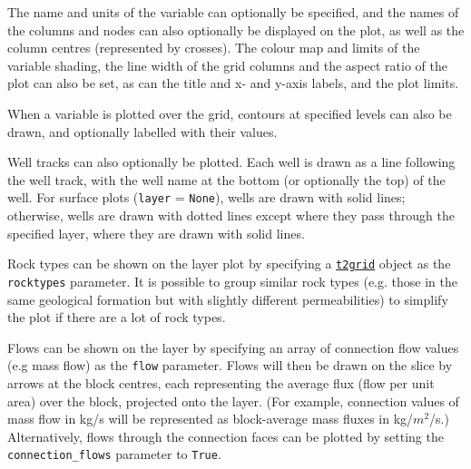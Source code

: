 The name and units of the variable can optionally be specified, and the names of the columns and nodes can also optionally be displayed on the plot, as well as the column centres (represented by crosses).  The colour map and limits of the variable shading, the line width of the grid columns and the aspect ratio of the plot can also be set, as can the title and x- and y-axis labels, and the plot limits.

When a variable is plotted over the grid, contours at specified levels can also be drawn, and optionally labelled with their values.

Well tracks can also optionally be plotted.  Each well is drawn as a line following the well track, with the well name at the bottom (or optionally the top) of the well.  For surface plots (\texttt{layer} = \texttt{None}), wells are drawn with solid lines; otherwise, wells are drawn with dotted lines except where they pass through the specified layer, where they are drawn with solid lines.

Rock types can be shown on the layer plot by specifying a \hyperref[t2grids]{\texttt{t2grid}} object as the \texttt{rocktypes} parameter.  It is possible to group similar rock types (e.g. those in the same geological formation but with slightly different permeabilities) to simplify the plot if there are a lot of rock types.

Flows can be shown on the layer by specifying an array of connection flow values (e.g mass flow) as the \texttt{flow} parameter.  Flows will then be drawn on the slice by arrows at the block centres, each representing the average flux (flow per unit area) over the block, projected onto the layer.  (For example, connection values of mass flow in kg/s will be represented as block-average mass fluxes in kg/$m^2$/s.)  Alternatively, flows through the connection faces can be plotted by setting the \texttt{connection\_flows} parameter to \texttt{True}.

